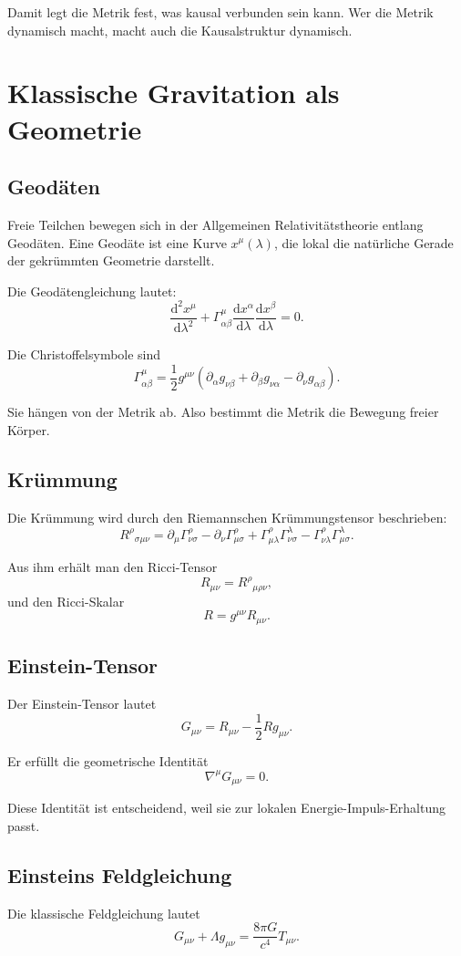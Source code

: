 \documentclass[11pt,a4paper,oneside]{book}
\theoremstyle{definition}
\theoremstyle{plain}
\theoremstyle{remark}
\newcommand{\dd}{\mathrm{d}}
\begin{document}
Damit legt die Metrik fest, was kausal verbunden sein kann. Wer die Metrik dynamisch macht, macht auch die Kausalstruktur dynamisch.

\chapter{Klassische Gravitation als Geometrie}
\section{Geodäten}
Freie Teilchen bewegen sich in der Allgemeinen Relativitätstheorie entlang Geodäten. Eine Geodäte ist eine Kurve $x^\mu(\lambda)$, die lokal die natürliche Gerade der gekrümmten Geometrie darstellt.

Die Geodätengleichung lautet:
\[
\frac{\dd^2 x^\mu}{\dd\lambda^2}
+\Gamma^\mu_{\alpha\beta}\frac{\dd x^\alpha}{\dd\lambda}
\frac{\dd x^\beta}{\dd\lambda}=0.
\]

Die Christoffelsymbole sind
\[
\Gamma^\mu_{\alpha\beta}=\frac12 g^{\mu\nu}\left(\partial_\alpha g_{\nu\beta}+\partial_\beta g_{\nu\alpha}-\partial_\nu g_{\alpha\beta}\right).
\]

Sie hängen von der Metrik ab. Also bestimmt die Metrik die Bewegung freier Körper.

\section{Krümmung}
Die Krümmung wird durch den Riemannschen Krümmungstensor beschrieben:
\[
R^\rho{}_{\sigma\mu\nu}
=\partial_\mu\Gamma^\rho_{\nu\sigma}
-\partial_\nu\Gamma^\rho_{\mu\sigma}
+\Gamma^\rho_{\mu\lambda}\Gamma^\lambda_{\nu\sigma}
-\Gamma^\rho_{\nu\lambda}\Gamma^\lambda_{\mu\sigma}.
\]

Aus ihm erhält man den Ricci-Tensor
\[
R_{\mu\nu}=R^\rho{}_{\mu\rho\nu},
\]
und den Ricci-Skalar
\[
R=g^{\mu\nu}R_{\mu\nu}.
\]

\section{Einstein-Tensor}
Der Einstein-Tensor lautet
\[
G_{\mu\nu}=R_{\mu\nu}-\frac12 Rg_{\mu\nu}.
\]

Er erfüllt die geometrische Identität
\[
\nabla^\mu G_{\mu\nu}=0.
\]

Diese Identität ist entscheidend, weil sie zur lokalen Energie-Impuls-Erhaltung passt.

\section{Einsteins Feldgleichung}
Die klassische Feldgleichung lautet
\[
G_{\mu\nu}+\Lambda g_{\mu\nu}=\frac{8\pi G}{c^4}T_{\mu\nu}.
\]
\end{document}
